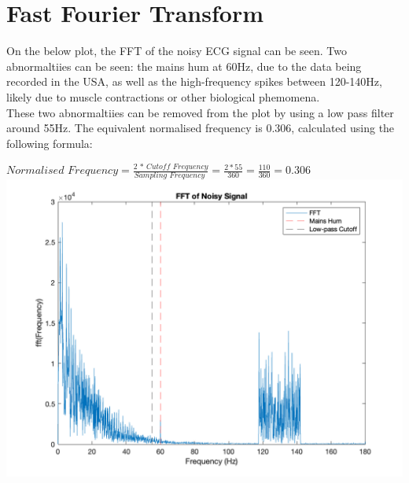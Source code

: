 \documentclass[11pt,oneside]{book}
\begin{document}
\chapter{Fast Fourier Transform}
On the below plot, the FFT of the noisy ECG signal can be seen. Two abnormaltiies can be seen: the mains hum at 60Hz, due to the data being recorded in the USA, as well as the high-frequency spikes between 120-140Hz, likely due to muscle contractions or other biological phemomena.
\\These two abnormaltiies can be removed from the plot by using a low pass filter around 55Hz. The equivalent normalised frequency is 0.306, calculated using the following formula:
\begin{center}
    $\textit{Normalised Frequency} = \frac{\textit{2 * Cutoff Frequency}}{\textit{Sampling Frequency }} = \frac{2 * 55}{360} = \frac{110}{360} = 0.306$
    \includegraphics[width=16cm]{graphics/noisy_fft.png}
\end{center}
\end{document}
